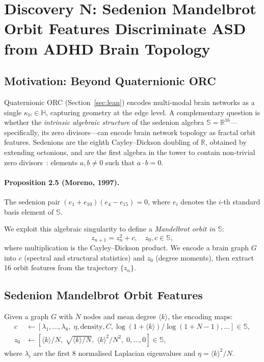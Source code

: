 \documentclass[11pt,a4paper]{article}
\begin{document}
\section{Discovery N: Sedenion Mandelbrot Orbit Features Discriminate ASD from ADHD Brain Topology}
\label{sec:sedenion_dual}

\subsection{Motivation: Beyond Quaternionic ORC}

Quaternionic ORC (Section~\ref{sec:lean}) encodes multi-modal brain networks as a single $\kappa_\mathbb{H} \in \mathbb{H}$, capturing geometry at the edge level. A complementary question is whether the \emph{intrinsic algebraic structure} of the sedenion algebra $\mathbb{S} = \mathbb{R}^{16}$---specifically, its zero divisors---can encode brain network topology as fractal orbit features. Sedenions are the eighth Cayley--Dickson doubling of $\mathbb{R}$, obtained by extending octonions, and are the first algebra in the tower to contain non-trivial zero divisors~\cite{moreno1998zero}: elements $a, b \neq 0$ such that $a \cdot b = 0$.

\paragraph{Proposition 2.5 (Moreno, 1997).}
The sedenion pair $(e_1 + e_{10})(e_4 - e_{15}) = 0$, where $e_i$ denotes the $i$-th standard basis element of $\mathbb{S}$.

We exploit this algebraic singularity to define a \emph{Mandelbrot orbit in $\mathbb{S}$}:
\begin{equation}
z_{n+1} = z_n^2 + c, \quad z_0, c \in \mathbb{S},
\label{eq:sed_mandelbrot}
\end{equation}
where multiplication is the Cayley--Dickson product. We encode a brain graph $G$ into $c$ (spectral and structural statistics) and $z_0$ (degree moments), then extract 16 orbit features from the trajectory $\{z_n\}$.

\subsection{Sedenion Mandelbrot Orbit Features}

Given a graph $G$ with $N$ nodes and mean degree $\langle k \rangle$, the encoding maps:
\begin{align}
c &\leftarrow [\lambda_1,\ldots,\lambda_8,\; \eta, \text{density}, C, \log(1{+}\langle k\rangle)/\log(1{+}N{-}1), \ldots] \in \mathbb{S}, \\
z_0 &\leftarrow [\langle k\rangle/N,\; \sqrt{\langle k\rangle/N},\; \langle k\rangle^2/N^2,\; 0,\ldots,0] \in \mathbb{S},
\end{align}
where $\lambda_i$ are the first 8 normalised Laplacian eigenvalues and $\eta = \langle k\rangle^2/N$.
\end{document}
